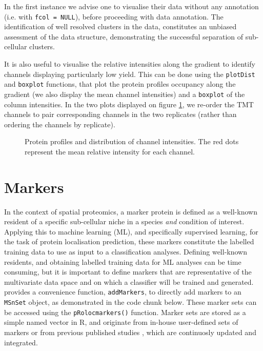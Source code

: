 In the first instance we advise one to visualise their data without
any annotation (i.e. with \texttt{fcol = NULL}), before proceeding with data
annotation. The identification of well resolved clusters in the data,
constitutes an unbiased assessment of the data structure,
demonstrating the successful separation of sub-cellular clusters.

It is also useful to visualise the relative intensities along the
gradient to identify channels displaying particularly low yield. This
can be done using the \texttt{plotDist} and \texttt{boxplot}
functions, that plot the protein profiles occupancy along the gradient
(we also display the mean channel intensities) and a \texttt{boxplot}
of the column intensities.  In the two plots displayed on figure
\ref{fig:qcbx}, we re-order the TMT channels to pair corresponding
channels in the two replicates (rather than ordering the channels by
replicate).

\begin{figure}[!ht]
  \centering
\begin{Schunk}
\end{Schunk}
\caption{Protein profiles and distribution of channel intensities. The
  red dots represent the mean relative intensity for each channel. }
  \label{fig:qcbx}
\end{figure}


\section*{Markers}

In the context of spatial proteomics, a marker protein is defined as a
well-known resident of a specific sub-cellular niche in a species
\textit{and} condition of interest. Applying this to machine learning
(ML), and specifically supervised learning, for the task of protein
localisation prediction, these markers constitute the labelled
training data to use as input to a classification analyses. Defining
well-known residents, and obtaining labelled training data for ML
analyses can be time consuming, but it is important to define markers
that are representative of the multivariate data space and on which a
classifier will be trained and generated.  provides a
convenience function, \texttt{addMarkers}, to directly add markers to
an \texttt{MSnSet} object, as demonstrated in the code chunk
below. These marker sets can be accessed using the
\texttt{pRolocmarkers()} function. Marker sets are stored as a simple
named vector in R, and originate from in-house user-defined sets of
markers or from previous published studies \cite{Gatto:2014b}, which
are continuosly updated and integrated.

